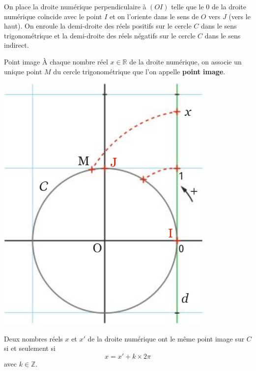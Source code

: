 \documentclass[11pt]{article}
\begin{document}
\noindent\begin{minipage}{.7\textwidth}
  On place la droite numérique perpendiculaire à $(OI)$ telle que le $0$ de la
  droite numérique coïncide avec le point $I$ et on l'oriente dans le sens de
  $O$ vers $J$ (vers le haut). On enroule la demi-droite des réels positifs sur
  le cercle $C$ dans le sens trigonométrique et la demi-droite des réels
  négatifs sur le cercle $C$ dans le sens indirect.
  \begin{defi}{Point image}
    À chaque nombre réel $x\in\mathbb{R}$ de la droite numérique, on associe un
    unique point $M$ du cercle trigonométrique que l'on appelle
    \textbf{point image}.
  \end{defi}
\end{minipage}
\begin{minipage}{.3\textwidth}
  \begin{center}
    \href{https://www.geogebra.org/m/xx3zcwut}{\includegraphics[scale=.32]{enroulement.png}}
  \end{center}
\end{minipage}

\begin{prop}
  Deux nombres réels $x$ et $x'$ de la droite numérique ont le même point image
  sur $C$ si et seulement si 
  \[
    x = x' + k\times2\pi
  \]
  avec $k\in\mathbb{Z}$.
\end{prop}
\end{document}
